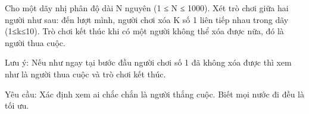 Cho một dãy nhị phân độ dài N nguyên (1 ≤ N ≤ 1000). Xét trò chơi giữa hai người như sau: đến lượt mình, người chơi xóa K số 1 liên tiếp nhau trong dãy (1≤k≤10). Trò chơi kết thúc khi có một người không thể xóa được nữa, đó là người thua cuộc.

Lưu ý: Nếu như ngay tại bước đầu người chơi số 1 đã không xóa được thì xem như là người thua cuộc và trò chơi kết thúc.

Yêu cầu: Xác định xem ai chắc chắn là người thắng cuộc. Biết mọi nước đi đều là tối ưu.
